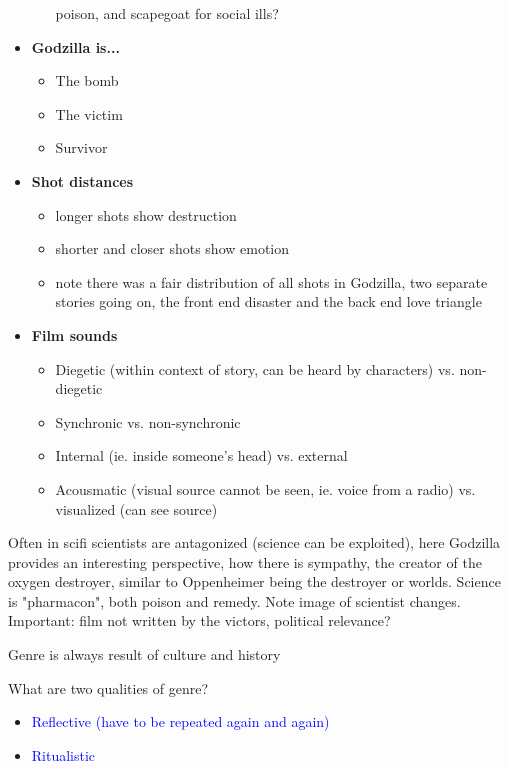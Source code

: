\documentclass[11pt,fleqn]{book}
\begin{document}
\begin{itemize}
\begin{itemize}
poison, and scapegoat for social ills?
    \end{itemize}
    \item \textbf{Godzilla is...}
    \begin{itemize}
        \item The bomb
        \item The victim
        \item Survivor
    \end{itemize}
    \item \textbf{Shot distances}
    \begin{itemize}
        \item longer shots show destruction
        \item shorter and closer shots show emotion
        \item note there was a fair distribution of all shots in Godzilla, two separate stories going on, the front end disaster and the back end love triangle
    \end{itemize}
    \item \textbf{Film sounds}
    \begin{itemize}
        \item Diegetic (within context of story, can be heard by characters) vs. non-diegetic
        \item Synchronic vs. non-synchronic
        \item Internal (ie. inside someone's head) vs. external 
        \item Acousmatic (visual source cannot be seen, ie. voice from a radio) vs. visualized (can see source)
    \end{itemize}
\end{itemize}
\begin{remark}
    Often in scifi scientists are antagonized (science can be exploited), here Godzilla provides an interesting perspective, how there is sympathy, the creator of the oxygen destroyer, similar to Oppenheimer being the destroyer or worlds. Science is "pharmacon", both poison and remedy. Note image of scientist changes. Important: film not written by the victors, political relevance?
\end{remark}
\begin{remark}
    Genre is always result of culture and history
\end{remark}

\begin{exercise}
What are two qualities of genre?
\begin{itemize}
\item \textcolor{blue}{Reflective (have to be repeated again and again)}
\item \textcolor{blue}{Ritualistic}
\end{itemize}
\end{exercise}
\end{document}
